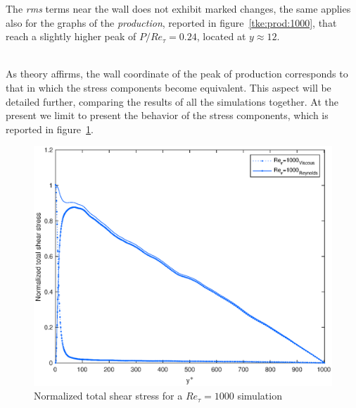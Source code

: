 The \emph{rms} terms near the wall does not exhibit marked changes, the same applies also for the graphs of the \emph{production}, reported in figure~\ref{tke:prod:1000}, that reach a slightly higher peak of $P/Re_{\tau}=0.24$, located at $y\approx12$.\\~\par

As theory affirms, the wall coordinate of the peak of production corresponds to that in which the stress components become equivalent. This aspect will be detailed further, comparing the results of all the simulations together.
At the present we limit to present the behavior of the stress components, which is reported in figure~\ref{stresses:1000}.

\begin{figure}
\begin{center}
\includegraphics[scale=0.55]{grafici/stresses_1000.eps}
\caption{Normalized total shear stress for a $Re_{\tau}=1000$ simulation}
\label{stresses:1000}
\end{center} 
\end{figure}